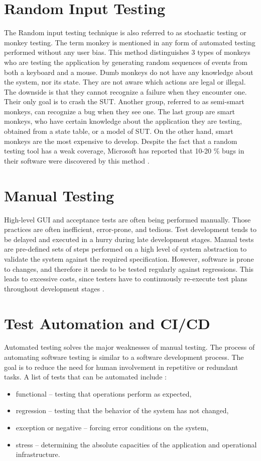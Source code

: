 \section{Random Input Testing}
The Random input testing technique is also referred to as stochastic testing or monkey testing. The term monkey is mentioned in any form of automated testing performed without any user bias. This method distinguishes 3 types of monkeys who are testing the application by generating random sequences of events from both a keyboard and a mouse. Dumb monkeys do not have any knowledge about the system, nor its state. They are not aware which actions are legal or illegal. The downside is that they cannot recognize a failure when they encounter one. Their only goal is to crash the SUT. Another group, referred to as semi-smart monkeys, can recognize a bug when they see one. The last group are smart monkeys, who have certain knowledge about the application they are testing, obtained from a state table, or a model of SUT. On the other hand, smart monkeys are the most expensive to develop. Despite the fact that a random testing tool has a weak coverage, Microsoft has reported that 10-20 \% bugs in their software were discovered by this method \cite{nyman}.

\section{Manual Testing}
High-level GUI and acceptance tests are often being performed manually. Those practices are often inefficient, error-prone, and tedious. Test development tends to be delayed and executed in a hurry during late development stages. Manual tests are pre-defined sets of steps performed on a high level of system abstraction to validate the system against the required specification. However, software is prone to changes, and therefore it needs to be tested regularly against regressions. This leads to excessive costs, since testers have to continuously re-execute test plans throughout development stages \cite{guitesting}.

\section{Test Automation and CI/CD}
Automated testing solves the major weaknesses of manual testing. The process of automating software testing is similar to a software development process. The goal is to reduce the need for human involvement in repetitive or redundant tasks. A list of tests that can be automated include \cite{ci_tests}:
\begin{itemize}
    \item functional -- testing that operations perform as expected,
    \item regression -- testing that the behavior of the system has not changed,
    \item exception or negative -- forcing error conditions on the system,
    \item stress -- determining the absolute capacities of the application and operational infrastructure.
\end{itemize}

